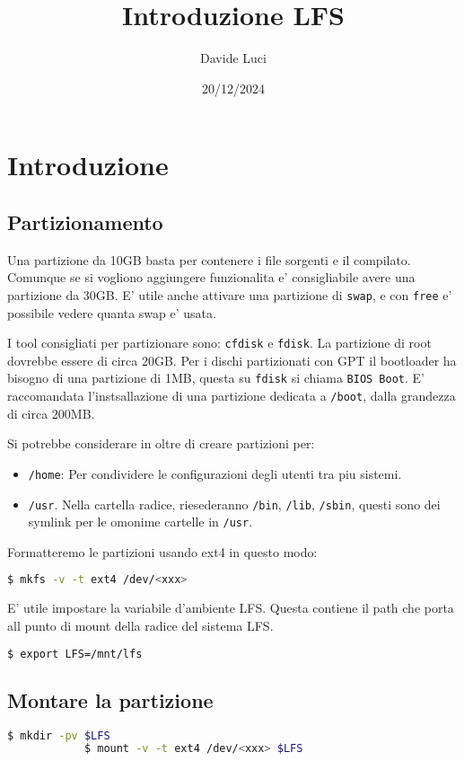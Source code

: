 \documentclass{article}
\title{Introduzione LFS}
\author{Davide Luci}
\date{20/12/2024}
\begin{document}
\section{Introduzione}
    \subsection{Partizionamento}
    \setlength{\parindent}{0cm}
        Una partizione da 10GB basta per contenere i file sorgenti e il compilato.
        Comunque se si vogliono aggiungere funzionalita e' consigliabile avere una partizione da 30GB.
        E' utile anche attivare una partizione di \texttt{swap}, e con
        \texttt{free} e' possibile vedere quanta swap e' usata.

        I tool consigliati per partizionare sono: \texttt{cfdisk} e \texttt{fdisk}.
        La partizione di root dovrebbe essere di circa 20GB. Per i dischi partizionati con GPT
        il bootloader ha bisogno di una partizione di 1MB, questa su \texttt{fdisk} si chiama \texttt{BIOS Boot}.
        E' raccomandata l'instsallazione di una partizione dedicata a \texttt{/boot}, dalla grandezza di
        circa 200MB. 

        Si potrebbe considerare in oltre di creare partizioni per:
        \begin{itemize}
            \item \texttt{/home}: Per condividere le configurazioni degli utenti tra piu sistemi.
            \item \texttt{/usr}. Nella cartella radice, riesederanno \texttt{/bin}, \texttt{/lib}, \texttt{/sbin}, questi sono dei symlink per
            le omonime cartelle in \texttt{/usr}.
        \end{itemize}

        Formatteremo le partizioni usando ext4 in questo modo:
        \noindent
        \begin{lstlisting}[language=bash]
            $ mkfs -v -t ext4 /dev/<xxx>
        \end{lstlisting}

        E' utile impostare la variabile d'ambiente  LFS. Questa contiene il path che porta all punto di mount della radice 
        del sistema LFS.
        \begin{lstlisting}[language=bash]
            $ export LFS=/mnt/lfs
        \end{lstlisting}
    \subsection{Montare la partizione}
        \begin{lstlisting}[language=bash]
            $ mkdir -pv $LFS
            $ mount -v -t ext4 /dev/<xxx> $LFS
        \end{lstlisting}
\end{document}
